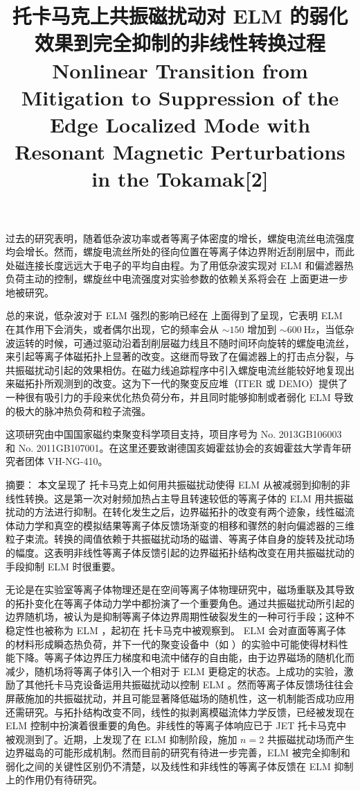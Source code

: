 \east 过去的研究表明，随着低杂波功率或者等离子体密度的增长，螺旋电流丝电流强度均会增长。然而，螺旋电流丝所处的径向位置在等离子体边界附近刮削层中，而此处磁连接长度远远大于电子的平均自由程。为了用低杂波实现对 ELM 和偏滤器热负荷主动的控制，螺旋丝中电流强度对实验参数的依赖关系将会在 \east 上面更进一步地被研究。

总的来说，低杂波对于 ELM 强烈的影响已经在 \east 上面得到了呈现，它表明 ELM 在其作用下会消失，或者偶尔出现，它的频率会从 $\sim 150$ 增加到 $\sim\SI{600}{\hertz}$，当低杂波运转的时候，可通过驱动沿着刮削层磁力线且不随时间环向旋转的螺旋电流丝，来引起等离子体磁拓扑上显著的改变。这继而导致了在偏滤器上的打击点分裂，与共振磁扰动引起的效果相仿。在磁力线追踪程序中引入螺旋电流丝能较好地复现出来磁拓扑所观测到的改变。这为下一代的聚变反应堆（ITER 或 DEMO）提供了一种很有吸引力的手段来优化热负荷分布，并且同时能够抑制或者弱化 ELM 导致的极大的脉冲热负荷和粒子流强。

这项研究由中国国家磁约束聚变科学项目支持，项目序号为 No. 2013GB106003 和 No. 2011GB107001。在这里还要致谢德国亥姆霍兹协会的亥姆霍兹大学青年研究者团体  VH-NG-410。



\title{{\heiti \east 托卡马克上共振磁扰动对 ELM 的弱化效果到完全抑制的非线性转换过程}\\Nonlinear Transition from Mitigation to Suppression of the Edge Localized Mode with Resonant Magnetic Perturbations in the \east Tokamak[2]}

{\heiti 摘要：} {\kaishu 本文呈现了 \east 托卡马克上如何用共振磁扰动使得 ELM 从被减弱到抑制的非线性转换。这是第一次对射频加热占主导且转速较低的等离子体的 ELM 用共振磁扰动的方法进行抑制。在转化发生之后，边界磁拓扑的改变有两个迹象，线性磁流体动力学和真空的模拟结果等离子体反馈场渐变的相移和骤然的射向偏滤器的三维粒子束流。转换的阈值依赖于共振磁扰动场的磁谱、等离子体自身的旋转及扰动场的幅度。这表明非线性等离子体反馈引起的边界磁拓扑结构改变在用共振磁扰动的手段抑制 ELM 时很重要。}

无论是在实验室等离子体物理还是在空间等离子体物理研究中，磁场重联及其导致的拓扑变化在等离子体动力学中都扮演了一个重要角色。通过共振磁扰动所引起的边界随机场，被认为是抑制等离子体边界周期性破裂发生的一种可行手段；这种不稳定性也被称为 ELM ，起初在 \ddd 托卡马克中被观察到。 ELM 会对直面等离子体的材料形成瞬态热负荷，并下一代的聚变设备中（如 \iter）的实验中可能使得材料性能下降。等离子体边界压力梯度和电流中储存的自由能，由于边界磁场的随机化而减少，随机场将等离子体引入一个相对于 ELM 更稳定的状态。\ddd 上成功的实验，激励了其他托卡马克设备运用共振磁扰动以控制 ELM 。然而等离子体反馈场往往会屏蔽施加的共振磁扰动，并且可能显著降低磁场的随机性，这一机制能否成功应用还需研究。与拓扑结构改变不同，线性的拟剥离模磁流体力学反馈，已经被发现在 ELM 控制中扮演着很重要的角色。非线性的等离子体响应已于 JET 托卡马克中被观测到了。近期，\ddd 上发现了在 ELM 抑制阶段，施加 $n=2$ 共振磁扰动场而产生边界磁岛的可能形成机制。然而目前的研究有待进一步完善，ELM 被完全抑制和弱化之间的关键性区别仍不清楚，以及线性和非线性的等离子体反馈在 ELM 抑制上的作用仍有待研究。

